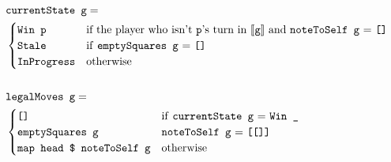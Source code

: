 \begin{equation}
\begin{split}
&\texttt{currentState g} = \\
&\begin{cases}
\texttt{Win p}&\text{if the player who isn't \texttt{p}'s turn in \mbox{$[\![ \texttt{g} ]\!]$} and \texttt{noteToSelf g} = \texttt{[]}} \\
\texttt{Stale}&\text{if \texttt{emptySquares g} = \texttt{[]}}\\
\texttt{InProgress}&\text{otherwise}\\
\end{cases}\\
&\\
&\texttt{legalMoves g} = \\
&\begin{cases}
\texttt{[]}&\text{if \texttt{currentState g} = \texttt{Win \_}}\\
\text{\texttt{emptySquares g}}&\text{\texttt{noteToSelf g} = \texttt{[[]]}} \\
\text{\texttt{map head \$ noteToSelf g}}&\text{otherwise} \\
\end{cases}
\end{split}
\nonumber
\end{equation}






